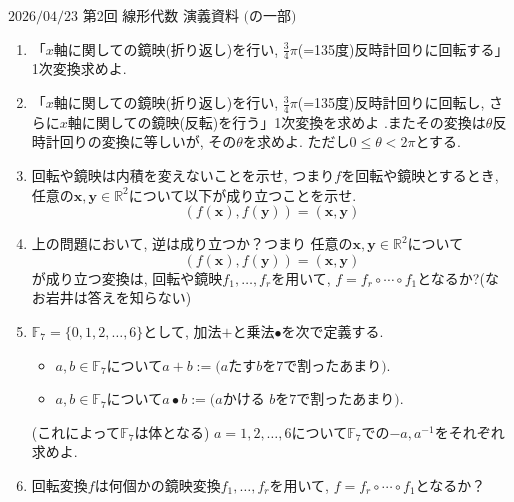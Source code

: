 \documentclass[dvipdfmx,a4paper,11pt]{article} %
\newcommand{\R}{\mathbb{R}}
\theoremstyle{definition}
\begin{document}
\newpage
$\boxed{\text{2026/04/23 第2回 線形代数 演義資料 (の一部)}}$
\begin{enumerate}[label=\textbf{問題}\arabic*.]
\item 「$x$軸に関しての鏡映(折り返し)を行い, $\frac{3}{4}\pi$(=135度)反時計回りに回転する」1次変換求めよ.
  \item 「$x$軸に関しての鏡映(折り返し)を行い, $\frac{3}{4}\pi$(=135度)反時計回りに回転し, さらに$x$軸に関しての鏡映(反転)を行う」1次変換を求めよ .またその変換は$\theta$反時計回りの変換に等しいが, その$\theta$を求めよ. 
  ただし$0 \le \theta <2\pi$とする. 

\item 回転や鏡映は内積を変えないことを示せ, 
つまり$f$を回転や鏡映とするとき, 任意の$\bm{x}, \bm{y} \in \R^2$について以下が成り立つことを示せ. 
    $$
    (f(\bm{x}), f(\bm{y})) = (\bm{x}, \bm{y})
    $$
    
 \item 上の問題において, 逆は成り立つか？つまり 任意の$\bm{x}, \bm{y} \in \R^2$について
    $$
    (f(\bm{x}), f(\bm{y})) = (\bm{x}, \bm{y})
    $$
が成り立つ変換は, 回転や鏡映$f_1, \ldots, f_r$を用いて, $f=f_r \circ \cdots \circ f_1$となるか?(なお岩井は答えを知らない)

\item $\mathbb{F}_7=\{0,1 ,2, \ldots, 6\}$として, 
  加法$+ $と乗法$\bullet$を次で定義する.
  \begin{itemize}
  \item $a, b \in \mathbb{F}_7$について$a+b:=\text{($a$たす$b$を$7$で割ったあまり)}$. 
\item $a, b \in \mathbb{F}_7$について$a\bullet b:=\text{($a$かける $b$を$7$で割ったあまり)}$. 
 \end{itemize}
(これによって$\mathbb{F}_7$は体となる)
$a=1,2, \ldots, 6$について$\mathbb{F}_7$での$-a, a^{-1}$をそれぞれ求めよ.

\item 回転変換$f$は何個かの鏡映変換$f_1, \ldots, f_r$を用いて, $f=f_r \circ \cdots \circ f_1$となるか？
\end{enumerate}
\newpage
\end{document}

